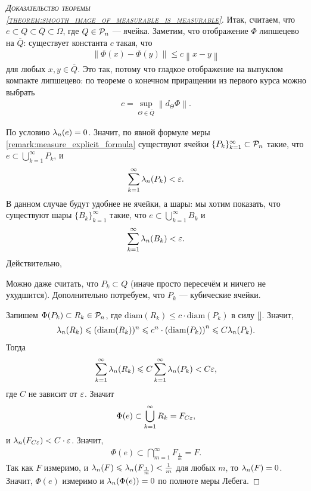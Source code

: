 \begin{proof}[\normalfont\textsc{Доказательство теоремы \ref{theorem:smooth_image_of_measurable_is_measurable}}]
 Итак, считаем, что $e \subset Q \subset \overline Q \subset \Omega$, где $Q \in \mathcal{P}_n$ --- ячейка. Заметим, что отображение $\Phi$ липшецево на $\overline Q$: существует константа $c$ такая, что \begin{align*}
  \left\| \Phi(x) - \Phi(y) \right\| \leqslant c \left\| x - y \right\|
 \end{align*} для любых $x, y \in \overline Q$. Это так, потому что гладкое отображение на выпуклом компакте липшецево: по теореме о конечном приращении из первого курса можно выбрать \begin{align*}
 c = \sup_{\Theta \in \overline Q} \left\| d_\Theta \Phi \right\|
 .\end{align*}

 По условию $\lambda_n(e) = 0$. Значит, по явной формуле меры \ref{remark:measure_explicit_formula} существуют ячейки $\{P_{k}\}_{k=1}^{\infty} \subset \mathcal{P}_n $ такие, что $e \subset \bigcup_{k=1}^{\infty} P_k $, и \begin{align*}
  \sum_{k=1}^{\infty} \lambda_n(P_k) < \varepsilon
 .\end{align*} В данном случае будут удобнее не ячейки, а шары: мы хотим показать, что существуют шары $\{B_{k}\}_{k=1}^{\infty} $ такие, что $e \subset \bigcup_{k=1}^{\infty} B_k$ и \begin{align*}
  \sum_{k=1}^{\infty} \lambda_n(B_k) < \varepsilon
 .\end{align*} Действительно, 


 Можно даже считать, что $P_k \subset Q$ (иначе просто пересечём и ничего не ухудшится). Дополнительно потребуем, что $P_k$ --- кубические ячейки.

 Запишем
 $
  \Phi(P_k) \subset R_k \in \mathcal{P}_n
  $, где $\mathrm{diam}(R_k) \leqslant c \cdot \mathrm{diam}(P_k)$ в силу \ref{}. Значит, 
\begin{align*}
\lambda_n(R_k) \leqslant (\mathrm{diam}(R_k))^{n} \leqslant c^{n} \cdot \left( \mathrm{diam}(P_k) \right)^{n} \leqslant C \lambda_n(P_k)
.\end{align*} Тогда
\begin{align*}
 \sum_{k=1}^{\infty} \lambda_n(R_k) \leqslant C \sum_{k=1}^{\infty} \lambda_n(P_k) < C \varepsilon
,\end{align*} где $C$ не зависит от $\varepsilon$. Значит \begin{align*}
\Phi(e) \subset \bigcup_{k=1}^{\infty} R_k = F_{C \varepsilon}
,\end{align*}  и $\lambda_n(F_{C\varepsilon}) < C \cdot \varepsilon$. Значит, 
\begin{align*}
 \Phi(e) \subset \bigcap_{m=1}^{\infty} F_{\frac{1}{m}} = F
.\end{align*} Так как $F$ измеримо, и $\lambda_n(F) \leqslant \lambda_n(F_{\frac{1}{m}}) < \frac{1}{m}$ для любых $m$, то $\lambda_n(F) = 0$. Значит, $\Phi(e)$ измеримо и $\lambda_n(\Phi(e)) = 0$ по полноте меры Лебега.


\end{proof}
